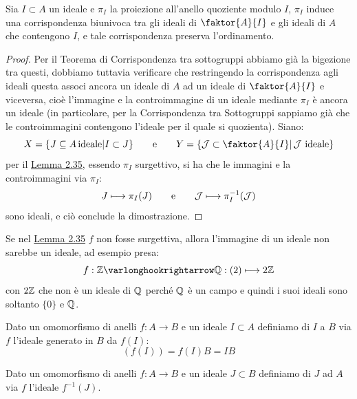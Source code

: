 \documentclass[11pt]{scrartcl}
\begin{document}
\begin{theorem}
    \label{corrispondenza}
    Sia $I \subset A$ un ideale e $\pi_I$ la proiezione all'anello quoziente modulo $I$, $\pi_I$ induce una corrispondenza biunivoca tra gli ideali di $\faktor{A}{I}$ e 
    gli ideali di $A$ che contengono $I$, e tale corrispondenza preserva l'ordinamento.
\end{theorem}

\begin{proof}
Per il Teorema di Corrispondenza tra sottogruppi abbiamo già la bigezione tra questi, dobbiamo tuttavia verificare che restringendo la corrispondenza agli ideali  questa associ ancora un 
ideale di $A$ ad un ideale di $\faktor{A}{I}$ e viceversa, cioè l'immagine e la controimmagine di un ideale mediante $\pi_I$ è ancora un ideale (in particolare, per la Corrispondenza tra Sottogruppi sappiamo già
che le controimmagini contengono l'ideale per il quale si quozienta). Siano:
    \[ X = \{J \subseteq A \, \text{ideale}| I \subset J\} \qquad \text e \qquad Y=\left\{\mathcal{J} \subset \faktor{A}{I} \m \,\text{$\mathcal{J}$ ideale}\right\}
        \]
per il \hyperref[2.35]{Lemma 2.35}, essendo $\pi_I$ surgettivo, si ha che le immagini e la controimmagini via $\pi_I$:
    \[ J \longmapsto \pi_I(J) \qquad \text e \qquad \mathcal{J} \longmapsto \pi_{I}^{-1}(\mathcal{J})
        \]
sono ideali, e ciò conclude la dimostrazione.
\end{proof}

\begin{example}
    Se nel \hyperref[2.35]{Lemma 2.35} $f$ non fosse surgettiva, allora l'immagine di un ideale non sarebbe un ideale, ad esempio presa:
        \[ f : \ZZ \varlonghookrightarrow \QQ : (2) \longmapsto 2\ZZ
            \]
    con $2\mathbb Z$ che non è un ideale di $\mathbb Q$ perché $\mathbb Q$ è un campo e quindi i suoi ideali sono soltanto $\{0\}$ e $\mathbb Q$.
\end{example}

\begin{definition}
    Dato un omomorfismo di anelli $f: A \longrightarrow B$ e un ideale $I \subset A$ definiamo  di $I$ a $B$ via $f$ l'ideale generato in $B$ da $f(I)$:
        \[ (f(I)) = f(I)B = IB
            \]
\end{definition}

\begin{definition}
    Dato un omomorfismo di anelli $f: A \longrightarrow B$ e un ideale $J \subset B$ definiamo  di $J$ ad $A$ via $f$ l'ideale $f^{-1}(J)$.
\end{definition}
\end{document}
